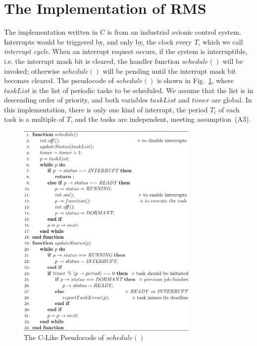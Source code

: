 \documentclass[journal]{IEEEtranTIE}
\begin{document}
\section{The Implementation of RMS}
\label{s:imp}
The implementation written in C is from an industrial avionic control
system.  Interrupts would be triggered by, and only by, the clock
every $T$, which we call \emph{interrupt cycle}. When an interrupt
request occurs, if the system is interruptible, i.e. the interrupt
mask bit is cleared, the handler function $\mathit{schedule()}$ will
be invoked; otherwise $\mathit{schedule()}$ will be pending until the
interrupt mask bit becomes cleared.  The pseudocode of
$\mathit{schedule()}$ is shown in Fig.~\ref{f:schedule}, where
$\mathit{taskList}$ is the list of periodic tasks to be scheduled. We
assume that the list is in descending order of priority, and both
variables $\mathit{taskList}$ and $\mathit{timer}$ are global. In this
implementation, there is only one kind of interrupt, the period $T_i$
of each task is a multiple of $T$, and the tasks are independent,
meeting assumption~(A3).

\begin{figure}[!t]
\centering
\includegraphics[width=8.8cm]{FIG1_15-TIE-3480.pdf}
\caption{The C-Like Pseudocode of $schedule()$}
\label{f:schedule}
\end{figure}
\end{document}
